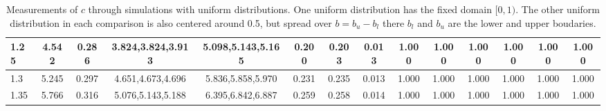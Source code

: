 \begin{table*}[h!]
\begin{center}
\begin{tabular}{| l | c | c | c | c | c | c | c | c | c | c | c | c | c |}
1.25 & 4.542 & 0.286 & 3.824,3.824,3.913 & 5.098,5.143,5.165  & 0.200  & 0.203  & 0.013  & 1.000  & 1.000  & 1.000  & 1.000  & 1.000  & 1.000 \\\hline
1.3 & 5.245 & 0.297 & 4.651,4.673,4.696 & 5.836,5.858,5.970  & 0.231  & 0.235  & 0.013  & 1.000  & 1.000  & 1.000  & 1.000  & 1.000  & 1.000 \\\hline
1.35 & 5.766 & 0.316 & 5.076,5.143,5.188 & 6.395,6.842,6.887  & 0.259  & 0.258  & 0.014  & 1.000  & 1.000  & 1.000  & 1.000  & 1.000  & 1.000 \\\hline
\end{tabular}
\caption{Measurements of $c$ through simulations
        with uniform distributions.
        One uniform distribution has the fixed domain $[0,1)$.
        The other uniform distribution in each comparison
        is also centered around 0.5,
        but spread over $b=b_u-b_l$ there $b_l$ and $b_u$ are the lower and upper boudaries.}
\end{center}
\end{table*}
